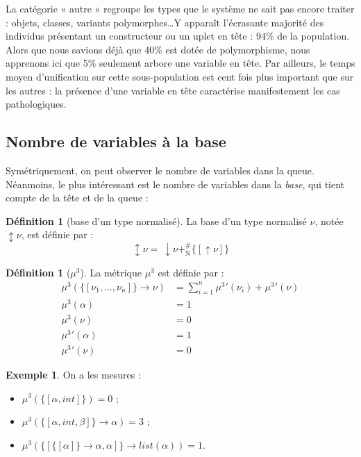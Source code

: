 \documentclass[a4paper]{report}
\theoremstyle{definition}
\newtheorem{definition}[theoreme]{Définition}
\newtheorem{exemple}[theoreme]{Exemple}
\newcommand{\mset}[1]{\{\![#1]\!\}}
\newcommand{\N}{\mathrm{N}}
\begin{document}
La catégorie « autre » regroupe les types que le système ne sait pas encore traiter : objets, classes, variants polymorphes\dots Y apparaît l'écrasante majorité des individus présentant un constructeur ou un uplet en tête : 94\% de la population. Alors que nous savions déjà que 40\% est dotée de polymorphisme, nous apprenons ici que 5\% seulement arbore une variable en tête. Par ailleurs, le temps moyen d'unification sur cette sous-population est cent fois plus important que sur les autres : la présence d'une variable en tête caractérise manifestement les cas pathologiques.


\subsection{Nombre de variables à la base}

Symétriquement, on peut observer le nombre de variables dans la queue. Néanmoins, le plus intéressant est le nombre de variables dans la \emph{base}, qui tient compte de la tête et de la queue :

\begin{definition}[base d'un type normalisé]
  La base d'un type normalisé $\nu$, notée $\updownarrow \nu$, est définie par :
  \[ \updownarrow \nu =\ \downarrow \nu +^\#_\N \mset{\uparrow \nu} \]
\end{definition}

\begin{definition}[$\mu^3$]
  La métrique $\mu^3$ est définie par :
  \begin{align*}
      \mu^3 (\mset{\nu_1, \dots, \nu_n} \rightarrow \nu) &=
      \sum_{i=1}^n {\mu^3}' (\nu_i) + {\mu^3}' (\nu)
    \\
      \mu^3 (\alpha) &=
      1
    \\
      \mu^3 (\nu) &=
      0
    \\
      {\mu^3}' (\alpha) &=
      1
    \\
      {\mu^3}' (\nu) &=
      0
  \end{align*}
\end{definition}

\begin{exemple}
	On a les mesures :
	\begin{itemize}
		\item $\mu^3 (\mset{\alpha, int}) = 0$ ;
		\item $\mu^3 (\mset{\alpha, int, \beta} \rightarrow \alpha) = 3$ ;
		\item $\mu^3 (\mset{\mset{\alpha} \rightarrow \alpha, \alpha} \rightarrow list (\alpha)) = 1$.
	\end{itemize}
\end{exemple}
\end{document}
